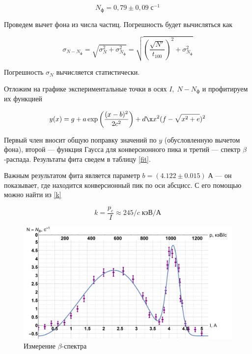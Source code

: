 \documentclass[12pt]{kiarticle}
\newcommand{\be}{\ensuremath{\beta}}
\begin{document}
\begin{equation}\label{}
N_ф = 0,79 \pm 0,09 \; с^{-1}
\end{equation}

Проведем вычет фона из числа частиц. Погрешность будет вычисляться как

\begin{equation}\label{}
\sigma_{N - N_ф} = \sqrt{\sigma_N^2 + \sigma_{N_ф}^2} = \sqrt{\left( \dfrac{\sqrt{N'}}{t_{100}} \right) ^2 + \sigma_{N_ф}^2} 
\end{equation}  

Погрешность $ \sigma_N $ вычисляется статистически. 

Отложим на графике экспериментальные точки в осях $ I, \; N-N_ф $ и профитируем их функцией 

\begin{equation}\label{}
y(x) = g + a \exp\left( \dfrac{(x - b)^2}{2c^2} \right) + d\x x^2(f - \sqrt{x^2 + e})^2
\end{equation}

Первый член вносит общую поправку значений по $ y $ (обусловленную вычетом фона), второй --- функция Гаусса для конверсионного пика и третий --- спектр \be-распада. Результаты фита сведем в таблицу \ref{fit}.

Важным результатом фита является параметр $ b = (4.122 \pm 0.015) \; А $ --- он показывает, где находится конверсионный пик по оси абсцисс. С его помощью можно найти из \eqref{k} 

\begin{equation}\label{}
k = \dfrac{p_c}{I} \approx 245/c \; кэВ / А
\end{equation}

	\begin{figure}[H]
	\label{graf_4}
	\includegraphics[scale=0.47]{grafp.pdf}
	\caption{Измерение \be-спектра}
\end{figure}
\end{document}
